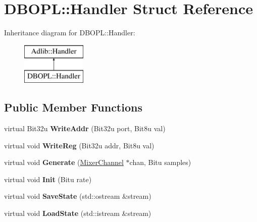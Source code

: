 \hypertarget{structDBOPL_1_1Handler}{\section{D\-B\-O\-P\-L\-:\-:Handler Struct Reference}
\label{structDBOPL_1_1Handler}
}
Inheritance diagram for D\-B\-O\-P\-L\-:\-:Handler\-:\begin{figure}[H]
\begin{center}
\leavevmode
\includegraphics[height=2.000000cm]{structDBOPL_1_1Handler}
\end{center}
\end{figure}
\subsection*{Public Member Functions}
\begin{DoxyCompactItemize}
\item 
\hypertarget{structDBOPL_1_1Handler_aac8e64336d3c16e778a429855c190a34}{virtual Bit32u {\bfseries Write\-Addr} (Bit32u port, Bit8u val)}\label{structDBOPL_1_1Handler_aac8e64336d3c16e778a429855c190a34}

\item 
\hypertarget{structDBOPL_1_1Handler_a64375f69fc5a044cdd06d39bb1194a1c}{virtual void {\bfseries Write\-Reg} (Bit32u addr, Bit8u val)}\label{structDBOPL_1_1Handler_a64375f69fc5a044cdd06d39bb1194a1c}

\item 
\hypertarget{structDBOPL_1_1Handler_a920b1f34a74cae5b0347275de5ecdaea}{virtual void {\bfseries Generate} (\hyperlink{classMixerChannel}{Mixer\-Channel} $\ast$chan, Bitu samples)}\label{structDBOPL_1_1Handler_a920b1f34a74cae5b0347275de5ecdaea}

\item 
\hypertarget{structDBOPL_1_1Handler_ad7bb128c4f9b7100bf26e8bd4aaec029}{virtual void {\bfseries Init} (Bitu rate)}\label{structDBOPL_1_1Handler_ad7bb128c4f9b7100bf26e8bd4aaec029}

\item 
\hypertarget{structDBOPL_1_1Handler_a4e501e803cdfae7ea5acd3a089f61a66}{virtual void {\bfseries Save\-State} (std\-::ostream \&stream)}\label{structDBOPL_1_1Handler_a4e501e803cdfae7ea5acd3a089f61a66}

\item 
\hypertarget{structDBOPL_1_1Handler_a5271b033ec734ecf5935058e610c3e08}{virtual void {\bfseries Load\-State} (std\-::istream \&stream)}\label{structDBOPL_1_1Handler_a5271b033ec734ecf5935058e610c3e08}

\end{DoxyCompactItemize}
